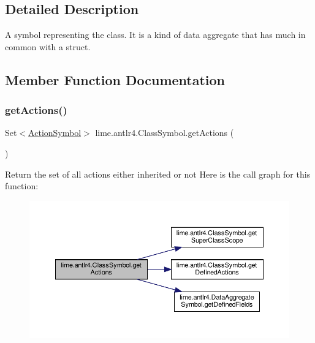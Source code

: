 \subsection{Detailed Description}
A symbol representing the class. It is a kind of data aggregate that has much in common with a struct. 

\subsection{Member Function Documentation}
\mbox{\label{classlime_1_1antlr4_1_1ClassSymbol_a18650f607ed0d77dda29df41cfd0f1cc}} 
\subsubsection{\texorpdfstring{get\+Actions()}{getActions()}}
{\footnotesize\ttfamily Set$<$\hyperlink{classlime_1_1antlr4_1_1ActionSymbol}{Action\+Symbol}$>$ lime.\+antlr4.\+Class\+Symbol.\+get\+Actions (\begin{DoxyParamCaption}{ }\end{DoxyParamCaption})}

Return the set of all actions either inherited or not Here is the call graph for this function\+:
\nopagebreak
\begin{figure}[H]
\begin{center}
\leavevmode
\includegraphics[width=350pt]{classlime_1_1antlr4_1_1ClassSymbol_a18650f607ed0d77dda29df41cfd0f1cc_cgraph}
\end{center}
\end{figure}
\mbox{\label{classlime_1_1antlr4_1_1ClassSymbol_a44bf9a31b2d4f8f92ae7314ccb7fac8a}} 
